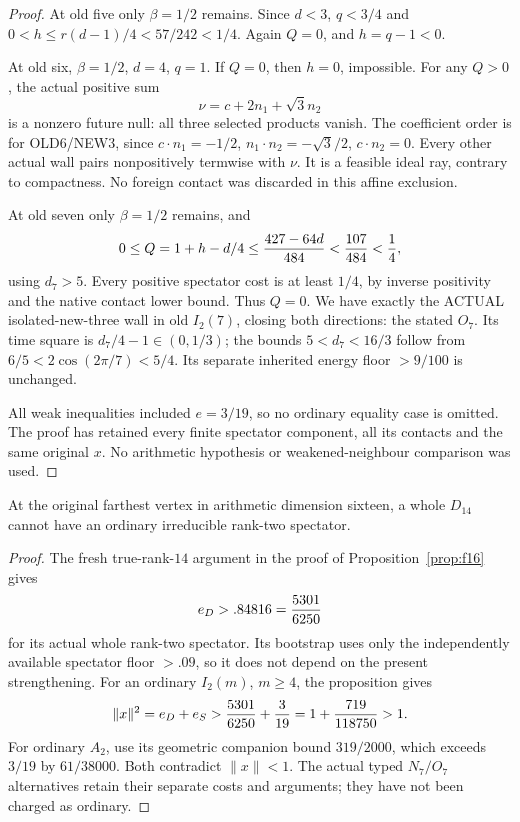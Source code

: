 \begin{proof}
At old five only \(\beta=1/2\) remains.
Since \(d<3\), \(q<3/4\) and
\(0<h\le r(d-1)/4<57/242<1/4\).
Again \(Q=0\), and \(h=q-1<0\).

At old six, \(\beta=1/2\), \(d=4\), \(q=1\).
If \(Q=0\), then \(h=0\), impossible.
For any \(Q>0\), the actual positive sum
\[
                          \nu=c+2n_1+\sqrt3n_2
\]
is a nonzero future null: all three selected products vanish.
The coefficient order is for OLD6/NEW3, since
\(c\cdot n_1=-1/2\), \(n_1\cdot n_2=-\sqrt3/2\),
\(c\cdot n_2=0\).
Every other actual wall pairs nonpositively termwise with \(\nu\).
It is a feasible ideal ray, contrary to compactness.
No foreign contact was discarded in this affine exclusion.

At old seven only \(\beta=1/2\) remains, and
\[
 0\le Q=1+h-d/4
 \le{427-64d\over484}<{107\over484}<{1\over4},
\]
using \(d_7>5\).
Every positive spectator cost is at least \(1/4\), by inverse
positivity and the native contact lower bound.  Thus \(Q=0\).
We have exactly the ACTUAL isolated-new-three wall in old
\(I_2(7)\), closing both directions: the stated \(O_7\).
Its time square is \(d_7/4-1\in(0,1/3)\);
the bounds \(5<d_7<16/3\) follow from
\(6/5<2\cos(2\pi/7)<5/4\).
Its separate inherited energy floor \(>9/100\) is unchanged.

All weak inequalities included \(e=3/19\), so no ordinary equality
case is omitted.  The proof has retained every finite spectator
component, all its contacts and the same original \(x\).
No arithmetic hypothesis or weakened-neighbour comparison was used.
\end{proof}

\begin{corollary}\label{cor:D14ordinarydihedral}
At the original farthest vertex in arithmetic dimension sixteen,
a whole \(D_{14}\) cannot have an ordinary irreducible
rank-two spectator.
\end{corollary}
\begin{proof}
The fresh true-rank-\(14\) argument in the proof of
Proposition~\ref{prop:f16} gives
\[
                         e_D>.84816={5301\over6250}
\]
for its actual whole rank-two spectator.
Its bootstrap uses only the independently available spectator
floor \(>.09\), so it does not depend on the present strengthening.
For an ordinary \(I_2(m)\), \(m\ge4\), the proposition gives
\[
 \|x\|^2=e_D+e_S>
 {5301\over6250}+{3\over19}
 =1+{719\over118750}>1 .
\]
For ordinary \(A_2\), use its geometric companion bound
\(319/2000\), which exceeds \(3/19\) by \(61/38000\).
Both contradict \(\|x\|<1\).
The actual typed \(N_7/O_7\) alternatives retain their separate
costs and arguments; they have not been charged as ordinary.
\end{proof}

